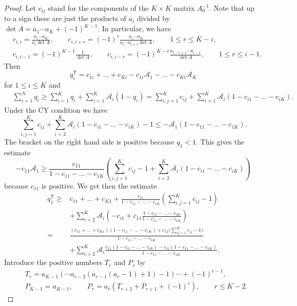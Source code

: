 \documentclass[pdftex]{sigma}
\numberwithin{equation}{section}
\def\A{{\mathcal A}}
\begin{document}
\begin{proof}
 Let $c_{ij}$ stand for the components of the $K \times K$ matrix $A_0^{-1}$. Note that up to a sign these are just the products of $a_i$ divided by $\det A = a_1\cdots a_K + (-1)^{K-1}$.
 In particular, we have
 \begin{align*}
 &c_{i,i} = \frac{a_1 \cdots a_K}{a_i \det A}, \qquad c_{i,i+r} = (-1)^r \frac{a_1 \cdots a_K}{a_i \cdots a_{i+r} \det A}, \qquad 1 \le r \le K-i,
 \\
 &c_{i,i-1} = (-1)^{K-1}\frac{1}{\det A}, \qquad c_{i,i-r} = (-1)^{K-r}\frac{a_{i-r+1}\cdots a_{i-1}}{\det A}, \qquad 1 \le r \le i-1.
 \end{align*}
 Then
 \[
 q_i^{\mathsf{T}} = c_{1i} + \dots + c_{Ki} - c_{1i} \A_1 - \dots - c_{Ki} \A_K
 \]
 for $1 \le i \le K$ and
 \begin{align*}
 & \sum_{i=1}^N q_i \ge \sum_{i=1}^K q_i + \sum_{i=1}^K \A_i (1 - q_i)
 = \sum_{i,j=1}^K c_{ij} + \sum_{i=1}^K \A_i (1 - c_{i1} - \dots - c_{iK}).
 \end{align*}
 Under the CY condition we have
 \[
 \sum_{i,j=1}^K c_{ij} + \sum_{i=2}^K \A_i (1 - c_{i1} - \dots - c_{iK}) - 1 \le - \A_1 (1 - c_{11} - \dots - c_{1K}).
 \]
 The bracket on the right hand side is positive because $q_1 < 1$. This gives the estimate
 \[
 - c_{11}\A_1 \ge
 \frac{c_{11}}{1 - c_{11} - \dots - c_{1K}} \left( \sum_{i,j=1}^K c_{ij} -1 + \sum_{i=2}^K \A_i (1 - c_{i1} - \dots - c_{iK}) \right)
 \]
 because $c_{11}$ is positive. We get then the estimate
 \begin{align*}
 q_1^{\mathsf{T}} \ge{}& c_{11} + \dots + c_{K1} + \frac{c_{11}}{1 - c_{11} - \dots - c_{1K}} \left( \sum_{i,j=1}^K c_{ij} - 1 \right)
 \\
 & + \sum_{i=2}^K \A_i \left( - c_{i1} + c_{11} \frac{1 - c_{i1} - \dots - c_{iK}}{1 - c_{11} - \dots - c_{1K}} \right)
 \\
 ={}& \frac{(c_{11}+\dots + c_{K1}) (1 - c_{11} - \dots - c_{1K}) + c_{11} \bigl( \sum_{ij=1}^K c_{ij} -1\bigr)}{1 - c_{11} - \dots - c_{1K}}
 \\
 & + \sum_{i=2}^K \A_i \frac{c_{11}(1 - c_{i1} - \dots - c_{iK}) - c_{i1} (1 - c_{11} - \dots - c_{1K})}{1 - c_{11} - \dots - c_{1K}}.
 \end{align*}
 Introduce the positive numbers $T_r$ and $P_r$ by
 \begin{align*}
 &T_r = a_{K-1}(\cdots a_{r-2}(a_{r-1}(a_r-1) + 1) -1) \cdots + (-1)^{r-1},
 \\
 &P_{K-1} = a_{K-1}, \qquad P_r = a_r (T_{r+2} + P_{r+1} + (-1)^{r}), \qquad r \le K-2.

\end{align*}
\end{proof}
\end{document}
